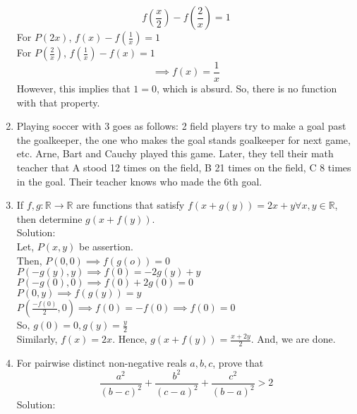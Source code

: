 \documentclass{article}
\begin{document}
\begin{enumerate}
    $$f(\frac{x}{2})-f(\frac{2}{x})=1$$
    For $P(2x)$, $f(x)- f(\frac{1}{x})=1$\\
    For $P(\frac{2}{x})$, $f(\frac{1}{x})-f(x)=1$
    $$\implies f(x)= \frac{1}{x}$$
    However, this implies that $1=0$, which is absurd. So, there is no function with that property.
    \item Playing soccer with 3 goes as follows: 2 field players try to make a goal past the goalkeeper, the one who makes the goal stands goalkeeper for next game, etc.
    Arne, Bart and Cauchy played this game. Later, they tell their math teacher that A stood 12 times on the field, B 21 times on the field, C 8 times in the goal. Their teacher knows who made the 6th goal.
    \item If $f,g: \mathbb{R} \to \mathbb{R}$ are functions that satisfy $f(x+g(y)) = 2x+y \forall x,y \in \mathbb{R}$, then determine $g(x+f(y)).$\\
    Solution:\\
    Let, $P(x,y)$ be assertion.\\
    Then, $P(0,0) \implies f(g(o))=0$\\
    $P(-g(y),y) \implies f(0)=-2g(y)+y$\\
    $P(-g(0),0) \implies f(0)+2g(0)=0$\\
    $P(0,y) \implies f(g(y))=y$\\
    $P(\frac{-f(0)}{2},0) \implies f(0)=-f(0) \implies f(0)=0$\\
    So, $g(0)=0, g(y)= \frac{y}{2}$\\
    Similarly, $f(x)=2x$. Hence, $g(x+f(y)) = \frac{x+2y}{2}$. And, we are done.
    \item For pairwise distinct non-negative reals $a,b,c$, prove that
    $$\frac{a^2}{(b-c)^2}+\frac{b^2}{(c-a)^2}+\frac{c^2}{(b-a)^2}>2$$
    Solution:\\
    
    
    

















\end{enumerate}
\end{document}
